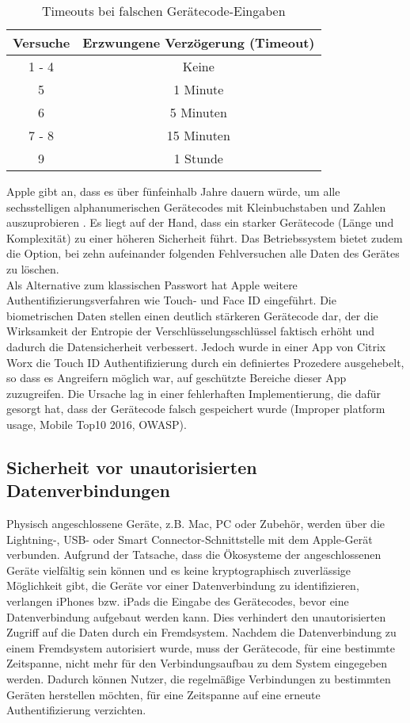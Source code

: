 \begin{table}[h]
	\centering
	\begin{tabular}{c|c}
	 Versuche & Erzwungene Verzögerung (Timeout) \\
	\hline
	 1 - 4 & Keine  \\
	\hline 
	 5 & 1 Minute  \\
	\hline 
	 6 & 5 Minuten  \\
	\hline 
	 7 - 8 & 15 Minuten  \\
	\hline 
	 9 &  1 Stunde  \\
	\end{tabular}
	  \caption{Timeouts bei falschen Gerätecode-Eingaben}
\end{table}


Apple gibt an, dass es über fünfeinhalb Jahre dauern würde, um alle sechsstelligen alphanumerischen Gerätecodes mit 
Kleinbuchstaben und Zahlen auszuprobieren \cite[S. 63]{apple2020}. Es liegt auf der Hand, dass ein starker Gerätecode 
(Länge und Komplexität) zu einer höheren Sicherheit führt. Das Betriebssystem bietet zudem die Option, 
bei zehn aufeinander folgenden Fehlversuchen alle Daten des Gerätes zu löschen. \\

Als Alternative zum klassischen Passwort hat Apple weitere Authentifizierungsverfahren wie Touch- und Face ID eingeführt. 
Die biometrischen Daten stellen einen deutlich stärkeren Gerätecode dar, der die Wirksamkeit der Entropie der 
Verschlüsselungsschlüssel faktisch erhöht und dadurch die Datensicherheit verbessert. Jedoch wurde in einer App von
Citrix Worx die Touch ID Authentifizierung durch ein definiertes Prozedere ausgehebelt, so dass es Angreifern möglich 
war, auf geschützte Bereiche dieser App zuzugreifen. Die Ursache lag in einer fehlerhaften Implementierung, die dafür 
gesorgt hat, dass der Gerätecode falsch gespeichert wurde (Improper platform usage, Mobile Top10 2016, OWASP). \\


\subsection{Sicherheit vor unautorisierten  Datenverbindungen}
Physisch angeschlossene Geräte,  z.B. Mac, PC oder Zubehör, werden über die Lightning-, USB- oder Smart 
Connector-Schnittstelle mit dem Apple-Gerät verbunden. Aufgrund der Tatsache, dass die Ökosysteme der
angeschlossenen Geräte vielfältig sein können und es keine kryptographisch zuverlässige Möglichkeit gibt,
die Geräte vor einer Datenverbindung zu identifizieren, verlangen iPhones bzw. iPads die Eingabe des Gerätecodes,
bevor eine Datenverbindung aufgebaut werden kann. \cite[S. 65]{apple2020} Dies verhindert den unautorisierten
Zugriff auf die Daten durch ein Fremdsystem. Nachdem die Datenverbindung zu einem Fremdsystem autorisiert wurde, 
muss der Gerätecode, für eine bestimmte Zeitspanne, nicht mehr für den Verbindungsaufbau zu dem System 
eingegeben werden. Dadurch können Nutzer, die regelmäßige Verbindungen zu bestimmten Geräten herstellen möchten,
für eine Zeitspanne auf eine erneute Authentifizierung verzichten. \\

